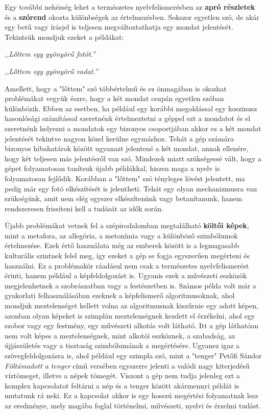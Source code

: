 Egy további nehézség lehet a természetes nyelvfelismerésben az \textbf{apró részletek} és a \textbf{szórend} okozta különbségek az értelmezésben. Sokszor egyetlen szó, de akár egy betű vagy írásjel is teljesen megváltoztathatja egy mondat jelentését. Tekintsük mondjuk ezeket a példákat:

\vspace{0.5cm}
\centerline{\textit{,,Lőttem egy gyönyörű fotót.''}}
\centerline{\textit{,,Lőttem egy gyönyörű vadat.''}}
\vspace{0.5cm}

Amellett, hogy a "lőttem" szó többértelmű és ez önmagában is okozhat problémákat vegyük észre, hogy a két mondat csupán egyetlen szóban különbözik. Ebben az esetben, ha például egy korábbi megoldással egy koszinusz hasonlósági számítással szeretnénk értelmeztetni a géppel ezt a mondatot és el szeretnénk helyezni a mondatok egy bizonyos csoportjában akkor ez a két mondat jelentését tekintve nagyon közel kerülne egymáshoz. Tehát a gép számára bizonyos hibahatárok között ugyanazt jelentené a két mondat, annak ellenére, hogy két teljesen más jelentésről van szó. Mindezek miatt szükségessé vált, hogy a gépet folyamatosan tanítsuk újabb példákkal, hiszen maga a nyelv is folyamatosan fejlődik. Korábban a "lőttem" szó tényleges lövést jelentett, ma pedig már egy fotó elkészítését is jelentheti. Tehát egy olyan mechanizmusra van szükségünk, amit nem elég egyszer elkészítenünk vagy betanítanunk, hanem rendszeresen frissíteni kell a tudását az idők során.

Újabb problémákat vetnek fel a szépirodalomban megtalálható \textbf{költői képek}, mint a metafora, az allegória, a metonímia vagy a különböző szimbólumok értelmezése. Ezek értő használata még az emberek között is a legmagasabb kulturális szintnek felel meg, így ezeket a gép se fogja egyszerűen megérteni és használni. Ez a problémakör ráadásul nem csak a természetes nyelvfelismerést érinti, hanem például a  képfeldolgozást is. Ugyanis ezek a művészeti eszközök megjelenhetnek a szobrászatban vagy a festészetben is. Számos példa volt már a gyakorlati felhasználásában ezeknek a képfelismerő algoritmusoknak, ahol mondjuk meztelenséget kellett volna az algoritmusnak kiszűrnie egy adott képen, azonban olyan képeket is szimplán meztelenségnek kezdett el érzékelni, ahol egy szobor vagy egy festmény, egy művészeti alkotás volt látható. Itt a gép láthatóan nem volt képes a meztelenségnek, mint alkotói eszköznek, a szabadság, az újjászületés vagy a tisztaság szimbólumának a megértésére. Ugyanez igaz a szövegfeldolgozásra is, ahol például egy szimpla szó, mint a "tenger" Petőfi Sándor \textit{Föltámadott a tenger} című versében egyszerre jelenti a valódi nagy kiterjedésű víztömeget, illetve a népek tömegét. Viszont a gép nem tudja jelenleg ezt a komplex kapcsolatot feltárni a nép és a tenger között akármennyi példát is mutatunk rá neki. Ez a kapcsolat akkor is egy hosszú megértési folyamatnak lesz az eredménye, mely magába foglal történelmi, művészeti, nyelvi és érzelmi tudást.

